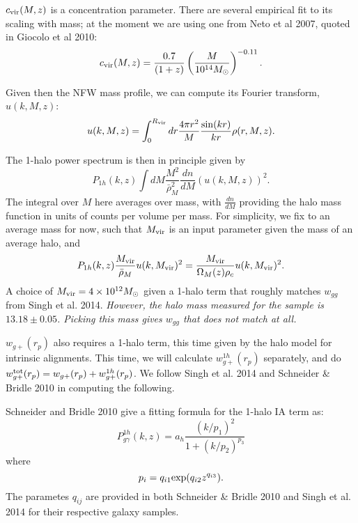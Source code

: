 \documentclass[onecolumn,amsmath,aps,fleqn, superscriptaddress]{revtex4}
\begin{document}
$c_{\rm vir}(M,z)$ is a concentration parameter. There are several empirical fit to its scaling with mass; at the moment we are using one from Neto et al 2007, quoted in Giocolo et al 2010:
\begin{equation}
c_{\rm vir}(M,z) = \frac{0.7}{(1+z)}\left(\frac{M}{10^{14}M_{\odot}}\right)^{-0.11}.
\label{cvir}
\end{equation}

Given then the NFW mass profile, we can compute its Fourier transform, $u(k, M, z)$:
\begin{equation}
u(k, M, z) = \int_0^{R_{\rm vir}} dr \frac{4 \pi r^2}{M}\frac{\sin(kr)}{kr}\rho(r, M, z).
\label{u}
\end{equation}

The 1-halo power spectrum is then in principle given by
\begin{equation}
P_{1h}(k,z) \int dM \frac{M^2}{\bar{\rho}_M^2} \frac{dn}{dM} (u(k, M, z))^2.
\label{P1h_dndm}
\end{equation}
The integral over $M$ here averages over mass, with $\frac{dn}{dM}$ providing the halo mass function in units of counts per volume per mass. For simplicity, we fix to an average mass for now, such that $M_{\rm vir}$ is an input parameter given the mass of an average halo, and 
\begin{equation}
P_{1h}(k,z) \frac{M_{\rm vir}}{\bar{\rho}_M} u(k,M_{\rm vir})^2 = \frac{M_{\rm vir}}{\Omega_M(z) \rho_c} u(k,M_{\rm vir})^2.
\label{P1h_onemass}
\end{equation}
A choice of $M_{\rm vir} = 4 \times 10^{12} M_{\odot}$ given a 1-halo term that roughly matches $w_{gg}$ from Singh et al. 2014. {\it However, the halo mass measured for the sample is $13.18 \pm 0.05$. Picking this mass gives $w_{gg}$ that does not match at all.}

$w_{g+}(r_p)$ also requires a 1-halo term, this time given by the halo model for intrinsic alignments. This time, we will calculate $w_{g+}^{1h}(r_p)$ separately, and do $w_{g+}^{\rm tot}(r_p) = w_{g+}(r_p) + w_{g+}^{1h}(r_p)$. We follow Singh et al. 2014 and Schneider \& Bridle 2010 in computing the following.

Schneider and Bridle 2010 give a fitting formula for the 1-halo IA term as:
\begin{equation}
P^{1h}_{g\gamma}(k,z) = a_h \frac{(k/p_1)^2}{1+ (k/p_2)^{p_3}}
\label{P1hIA}
\end{equation}
where
\begin{equation}
p_i = q_{i1} {\rm exp}(q_{i2} z^{q_{i3}}).
\label{pi}
\end{equation}
The parametes $q_{ij}$ are provided in both Schneider \& Bridle 2010 and Singh et al. 2014 for their respective galaxy samples.
\end{document}
